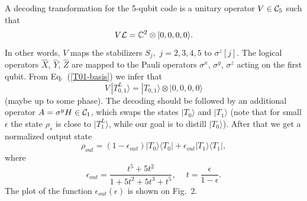 \documentclass[pra,twocolumn,showpacs]{revtex4}
\newcommand{\CC}{\mathbb{C}}
\newcommand{\calL}{{\cal L }}
\newcommand{\la}{\langle}
\newcommand{\ra}{\rangle}
\newcommand*{\Cl}[1]{{\cal C}_{#1}}
\newcommand{\ep}{\epsilon}
\newcommand{\sx}{\sigma^x}
\newcommand{\sy}{\sigma^y}
\newcommand{\sz}{\sigma^z}
\newcommand{\sm}{\sigma}
\begin{document}
A decoding transformation for the 5-qubit code is a
unitary operator $V\in \Cl{5}$ such that
\[
V \calL = \CC^2\otimes |0,0,0,0\ra.
\]
In other words, $V$ maps the stabilizers $S_j$,\, $j=2,3,4,5$ to $\sz[j]$. The
logical operators $\hat{X}$, $\hat{Y}$, $\hat{Z}$ are mapped to the Pauli
operators $\sx$, $\sy$, $\sz$ acting on the first qubit. From
Eq.~(\ref{T01-basis}) we infer that
\[
V\, |T_{0,1}^L\ra= |T_{0,1}\ra\otimes |0,0,0,0\ra
\]
(maybe up to some phase). The decoding should be followed by an additional
operator $A=\sm^y H \in \Cl{1}$, which swaps the states $|T_0\ra$ and
$|T_1\ra$ (note that for small $\ep$ the state $\rho_s$ is close to
$|T_1^L\ra$, while our goal is to distill $|T_0\ra$).  After that we get a
normalized output state
\[
\rho_{out} = (1-\epsilon_{out})|T_0\ra\la T_0| +
\epsilon_{out} |T_1\ra\la T_1|,
\]
where
\begin{equation}
\label{epsilon}
\epsilon_{out}= \frac{t^5 + 5t^2}{1 + 5t^2 + 5t^3 + t^5 }, \quad\
t=\frac{\epsilon}{1-\epsilon}.
\end{equation}
The plot of the function $\epsilon_{out}(\epsilon)$ is shown on Fig.~2.
\end{document}
